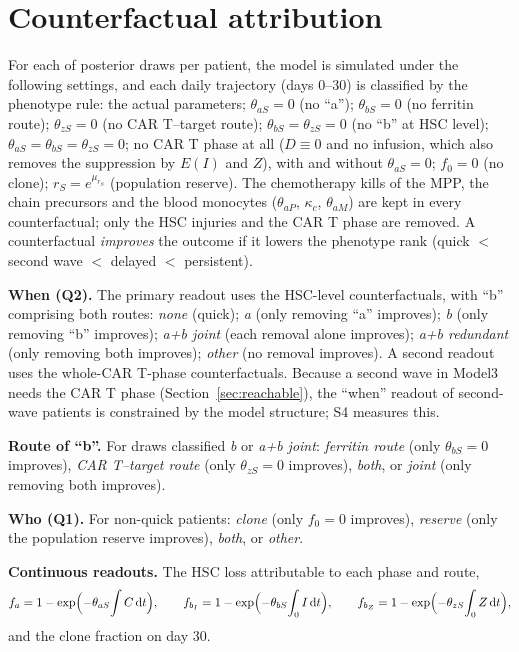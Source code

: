 \documentclass[11pt]{article}
\newcommand{\dd}{\mathrm{d}}
\begin{document}
\section{Counterfactual attribution}
For each of \valAttrib{} posterior draws per patient, the model is simulated under the following settings, and each daily trajectory (days 0--30) is classified by the phenotype rule: the actual parameters; $\theta_{aS}=0$ (no ``a''); $\theta_{bS}=0$ (no ferritin route); $\theta_{zS}=0$ (no CAR T--target route); $\theta_{bS}=\theta_{zS}=0$ (no ``b'' at HSC level); $\theta_{aS}=\theta_{bS}=\theta_{zS}=0$; no CAR T phase at all ($D\equiv0$ and no infusion, which also removes the suppression by $E(I)$ and $Z$), with and without $\theta_{aS}=0$; $f_0=0$ (no clone); $r_S=e^{\mu_{r_S}}$ (population reserve). The chemotherapy kills of the MPP, the chain precursors and the blood monocytes ($\theta_{aP}$, $\kappa_c$, $\theta_{aM}$) are kept in every counterfactual; only the HSC injuries and the CAR T phase are removed. A counterfactual \emph{improves} the outcome if it lowers the phenotype rank (quick $<$ second wave $<$ delayed $<$ persistent).

\textbf{When (Q2).} The primary readout uses the HSC-level counterfactuals, with ``b'' comprising both routes: \emph{none} (quick); \emph{a} (only removing ``a'' improves); \emph{b} (only removing ``b'' improves); \emph{a+b joint} (each removal alone improves); \emph{a+b redundant} (only removing both improves); \emph{other} (no removal improves). A second readout uses the whole-CAR T-phase counterfactuals. Because a second wave in Model3 needs the CAR T phase (Section~\ref{sec:reachable}), the ``when'' readout of second-wave patients is constrained by the model structure; S4 measures this.

\textbf{Route of ``b''.} For draws classified \emph{b} or \emph{a+b joint}: \emph{ferritin route} (only $\theta_{bS}=0$ improves), \emph{CAR T--target route} (only $\theta_{zS}=0$ improves), \emph{both}, or \emph{joint} (only removing both improves).

\textbf{Who (Q1).} For non-quick patients: \emph{clone} (only $f_0=0$ improves), \emph{reserve} (only the population reserve improves), \emph{both}, or \emph{other}.

\textbf{Continuous readouts.} The HSC loss attributable to each phase and route,
\begin{equation}
f_a = 1-\exp\Bigl(-\theta_{aS}\!\int C\,\dd t\Bigr),\qquad f_{b_I} = 1-\exp\Bigl(-\theta_{bS}\!\int_0 I\,\dd t\Bigr),\qquad f_{b_Z} = 1-\exp\Bigl(-\theta_{zS}\!\int_0 Z\,\dd t\Bigr),
\end{equation}
and the clone fraction on day 30.
\end{document}
